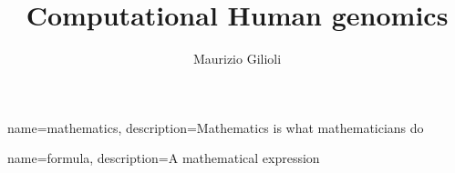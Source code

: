 

\title{\Huge\textbf{Computational Human genomics}}

\author{ Maurizio Gilioli \\
}

\makeglossaries

{
        name=mathematics,
        description={Mathematics is what mathematicians do}
}

{
        name=formula,
        description={A mathematical expression}
}



\maketitle
\tableofcontents

%  










\clearpage

\printglossary
% 


% 



